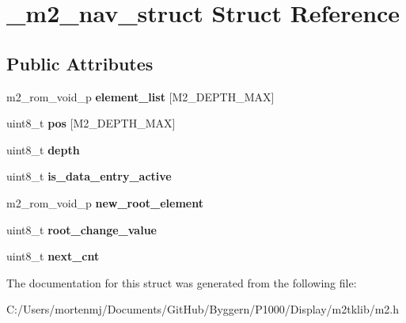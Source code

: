 \hypertarget{struct__m2__nav__struct}{\section{\-\_\-m2\-\_\-nav\-\_\-struct Struct Reference}
\label{struct__m2__nav__struct}
}
\subsection*{Public Attributes}
\begin{DoxyCompactItemize}
\item 
\hypertarget{struct__m2__nav__struct_a608b3e4141070defdf0272acffbd9c12}{m2\-\_\-rom\-\_\-void\-\_\-p {\bfseries element\-\_\-list} \mbox{[}M2\-\_\-\-D\-E\-P\-T\-H\-\_\-\-M\-A\-X\mbox{]}}\label{struct__m2__nav__struct_a608b3e4141070defdf0272acffbd9c12}

\item 
\hypertarget{struct__m2__nav__struct_a5d31ffe3f01e1c9e5561b2fc0ccf46c7}{uint8\-\_\-t {\bfseries pos} \mbox{[}M2\-\_\-\-D\-E\-P\-T\-H\-\_\-\-M\-A\-X\mbox{]}}\label{struct__m2__nav__struct_a5d31ffe3f01e1c9e5561b2fc0ccf46c7}

\item 
\hypertarget{struct__m2__nav__struct_abbeee4ffdb153585fad5c4b118ca4ec5}{uint8\-\_\-t {\bfseries depth}}\label{struct__m2__nav__struct_abbeee4ffdb153585fad5c4b118ca4ec5}

\item 
\hypertarget{struct__m2__nav__struct_a8e2e92294ae296e27d9c6bf4b1ae3f78}{uint8\-\_\-t {\bfseries is\-\_\-data\-\_\-entry\-\_\-active}}\label{struct__m2__nav__struct_a8e2e92294ae296e27d9c6bf4b1ae3f78}

\item 
\hypertarget{struct__m2__nav__struct_a1f04bae6b29b3f6299eadc95166d993c}{m2\-\_\-rom\-\_\-void\-\_\-p {\bfseries new\-\_\-root\-\_\-element}}\label{struct__m2__nav__struct_a1f04bae6b29b3f6299eadc95166d993c}

\item 
\hypertarget{struct__m2__nav__struct_a9b9071ad9161cf304576e5b7427fb625}{uint8\-\_\-t {\bfseries root\-\_\-change\-\_\-value}}\label{struct__m2__nav__struct_a9b9071ad9161cf304576e5b7427fb625}

\item 
\hypertarget{struct__m2__nav__struct_a68fe7c7b8f5d494b154b6c3f4ae3eb53}{uint8\-\_\-t {\bfseries next\-\_\-cnt}}\label{struct__m2__nav__struct_a68fe7c7b8f5d494b154b6c3f4ae3eb53}

\end{DoxyCompactItemize}


The documentation for this struct was generated from the following file\-:\begin{DoxyCompactItemize}
\item 
C\-:/\-Users/mortenmj/\-Documents/\-Git\-Hub/\-Byggern/\-P1000/\-Display/m2tklib/m2.\-h\end{DoxyCompactItemize}
